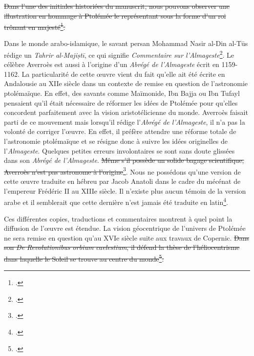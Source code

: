 \st{Dans l'une des initiales historiées du manuscrit, nous pouvons observer une illustration en hommage à Ptolémée le représentant sous la forme d'un roi trônant en majesté\footcite{TraductionLatineLAlmageste}.}

Dans le monde arabo-islamique, le savant persan Mohammad Nasir al-Din al-Tūs rédige un \textit{Tahrir al-Majiṣtī}, ce qui signifie \textit{Commentaire sur l'Almageste}\footcite{universalisMOHAMMADNASIRALDIN2008}.
Le célèbre Averroès est aussi à l'origine d'un \textit{Abrégé de l'Almageste} écrit en 1159-1162.
La particularité de cette œuvre vient du fait qu'elle ait été écrite en Andalousie au XIIe siècle dans un contexte de remise en question de l'astronomie ptolémaïque.
En effet, des savants comme Maïmonide, Ibn Bajja ou Ibn Tufayl pensaient qu'il était nécessaire de réformer les idées de Ptolémée pour qu'elles concordent parfaitement avec la vision aristotélicienne du monde.
Averroès faisait parti de ce mouvement mais lorsqu'il rédige l'\textit{Abrégé de l'Almageste}, il n'a pas la volonté de corriger l'œuvre.
En effet, il préfère attendre une réforme totale de l'astronomie ptolémaïque et se résigne donc à suivre les idées originelles de l'\textit{Almageste}.
Quelques petites erreurs involontaires se sont sans doute glissées dans son \textit{Abrégé de l'Almageste}.
\st{Même s'il possède un solide bagage scientifique, Averroès n'est pas astronome à l'origine}\footcite{layAverroesAbregeDastronomie1998}.
Nous ne possédons qu'une version de cette œuvre traduite en hébreu par Jacob Anatoli dans le cadre du mécénat de l'empereur Frédéric II au XIIIe siècle.
Il n'existe plus aucun témoin de la version arabe et il semblerait que cette dernière n'est jamais été traduite en latin\footcite{layAverroesHebraicusInedit2005}.

Ces différentes copies, traductions et commentaires montrent à quel point la diffusion de l'œuvre est étendue.
La vision géocentrique de l'univers de Ptolémée ne sera remise en question qu'au XVIe siècle suite aux travaux de Copernic.
\st{Dans son \textit{De Revolutionibus orbium caelestium}, il défend la thèse de l'héliocentrisme dans laquelle le Soleil se trouve au centre du monde\footcite{verdetHELIOCENTRISME2008}.}